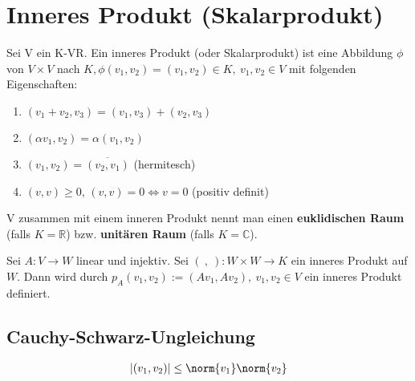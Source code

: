 \chapter{Inneres Produkt (Skalarprodukt)}
\begin{definition}
Sei V ein K-VR. Ein inneres Produkt (oder Skalarprodukt) ist eine Abbildung $\phi$ von $V \times V$ nach $K, \phi (v_1,v_2) = (v_1,v_2) \in K,~v_1,v_2 \in V$ mit folgenden Eigenschaften:
\begin{enumerate}
	\item $(v_1+v_2,v_3) = (v_1,v_3)+(v_2,v_3)$
	\item $(\alpha v_1,v_2) = \alpha (v_1,v_2)$
	\item $(v_1,v_2) = \overline{(v_2,v_1)}$ (hermitesch)
	\item $(v,v) \geq 0$, $(v,v) = 0 \Leftrightarrow v=0$ (positiv definit)
\end{enumerate}
\end{definition}
\begin{remark}
V zusammen mit einem inneren Produkt nennt man einen \textbf{euklidischen Raum} (falls $K=\mathbb{R}$) bzw. \textbf{unitären Raum} (falls $K=\mathbb{C}$).
\end{remark}

\begin{lemma}
Sei $A:V \rightarrow W$ linear und injektiv. Sei $(~,~):W \times W \rightarrow K$ ein inneres Produkt auf $W$. Dann wird durch $p_A(v_1,v_2):=(Av_1,Av_2),~v_1,v_2 \in V$ ein inneres Produkt definiert.
\end{lemma}

\section{Cauchy-Schwarz-Ungleichung}
\begin{theorem}
\begin{align*}
|(v_1,v_2)| \leq \norm{v_1} \norm{v_2}
\end{align*}
\end{theorem}

